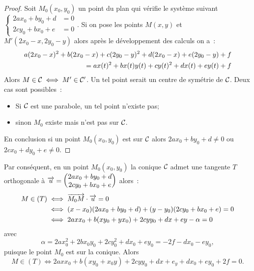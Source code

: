 \begin{proof}
  Soit \(M_0(x_0, y_0)\) un point du plan qui vérifie le système suivant 
  \(\begin{cases}2ax_0 + by_0 + d & = 0 \\ 2cy_0 + bx_0 + e & = 0\end{cases}\). Si 
  on pose les points \(M(x, y)\) et \(M'(2x_0-x, 2y_0-y)\) alors après le 
  développement des calculs on a~:
  \begin{align}
    a(2x_0-x)^2 + b(2x_0-x) + c(2y_0-y)^2 + d(2x_0-x) + e(2y_0-y) + f \notag \\
    = ax(t)^2 + bx(t)y(t) + cy(t)^2 + dx(t) + ey(t) + f
  \end{align}
  Alors \(M \in \mathcal{C}_{{}} \iff M' \in \mathcal{C}_{{}}'\). Un tel point serait un 
  centre de symétrie de \(\mathcal{C}_{{}}\). Deux cas sont possibles~:
  \begin{itemize}
    \item Si \(\mathcal{C}_{{}}\) est une parabole, un tel point n'existe pas;
    \item sinon \(M_0\) existe mais n'est pas sur \(\mathcal{C}_{{}}\).
  \end{itemize}
  En conclusion si un point \(M_0(x_0, y_0)\) est sur \(\mathcal{C}_{{}}\) alors 
  \(2ax_0 + by_0 + d \neq 0\) ou \(2cx_0 + dy_0 + e \neq 0\).
\end{proof}

Par conséquent, en un point \(M_0(x_0, y_0)\) la conique \(\mathcal{C}_{{}}\) 
admet une tangente \(T\) orthogonale à \(\overrightarrow{u} = \begin{pmatrix} 2ax_0 
+by_0 +d \\ 2cy_0 + bx_0 + e \end{pmatrix}\)  alors~:
\begin{align}
  M \in (T) &\iff \overrightarrow{M_0 M} \cdot \overrightarrow{u} = 0 \\
            &\iff (x-x_0)(2ax_0 + by_0 + d) + (y-y_0)(2cy_0 + bx_0 + e) = 0 \\
            &\iff 2axx_0 + b(xy_0 + yx_0) + 2cyy_0 +dx + ey - \alpha = 0
\end{align}
avec
\begin{equation}
  \alpha = 2ax_0^2+  2bx_0y_0 + 2cy_0^2 + dx_0 + ey_0 = -2f-dx_0-ey_0,
\end{equation}
puisque le point \(M_0\) est sur la conique. Alors
\begin{equation}
  M \in (T) \iff 2axx_0 + b(xy_0 + x_0y) + 2cyy_0 + dx + e_y + dx_0 + ey_0 + 2f = 0.
\end{equation}

